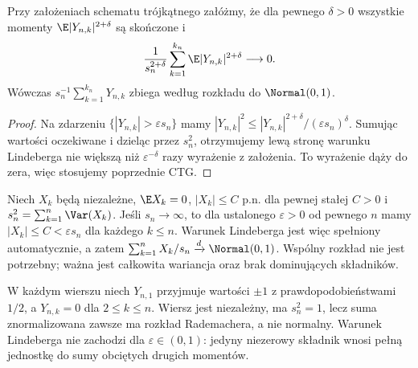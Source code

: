 \begin{wniosek}
Przy założeniach schematu trójkątnego załóżmy,
że dla pewnego $\delta>0$ wszystkie momenty
$\E|Y_{n,k}|^{2+\delta}$ są skończone i
\[
\frac{1}{s_n^{2+\delta}}
\sum_{k=1}^{k_n}\E|Y_{n,k}|^{2+\delta}
\longrightarrow0.
\]
Wówczas $s_n^{-1}\sum_{k=1}^{k_n}Y_{n,k}$
zbiega według rozkładu do $\Normal(0,1)$.
\end{wniosek}
\begin{proof}
Na zdarzeniu $\{|Y_{n,k}|>\varepsilon s_n\}$
mamy $|Y_{n,k}|^2\leq
|Y_{n,k}|^{2+\delta}/(\varepsilon s_n)^\delta$.
Sumując wartości oczekiwane i dzieląc przez $s_n^2$,
otrzymujemy lewą stronę warunku Lindeberga
nie większą niż $\varepsilon^{-\delta}$ razy
wyrażenie z założenia. To wyrażenie dąży do zera,
więc stosujemy poprzednie CTG.
\end{proof}

\begin{przyklad}
Niech $X_k$ będą niezależne, $\E X_k=0$,
$|X_k|\leq C$ p.n. dla pewnej stałej $C>0$ i
$s_n^2=\sum_{k=1}^n\Var(X_k)$.
Jeśli $s_n\to\infty$, to dla ustalonego
$\varepsilon>0$ od pewnego $n$ mamy
$|X_k|\leq C<\varepsilon s_n$ dla każdego
$k\leq n$. Warunek Lindeberga jest więc
spełniony automatycznie, a zatem
$\sum_{k=1}^nX_k/s_n\xrightarrow d \Normal(0,1)$.
Wspólny rozkład nie jest potrzebny; ważna jest
całkowita wariancja oraz brak dominujących składników.
\end{przyklad}

\begin{przyklad}
W każdym wierszu niech $Y_{n,1}$ przyjmuje
wartości $\pm1$ z prawdopodobieństwami $1/2$,
a $Y_{n,k}=0$ dla $2\leq k\leq n$.
Wiersz jest niezależny, ma $s_n^2=1$,
lecz suma znormalizowana zawsze ma rozkład
Rademachera, a nie normalny.
Warunek Lindeberga nie zachodzi dla
$\varepsilon\in(0,1)$: jedyny niezerowy składnik
wnosi pełną jednostkę do sumy obciętych drugich
momentów.
\end{przyklad}

